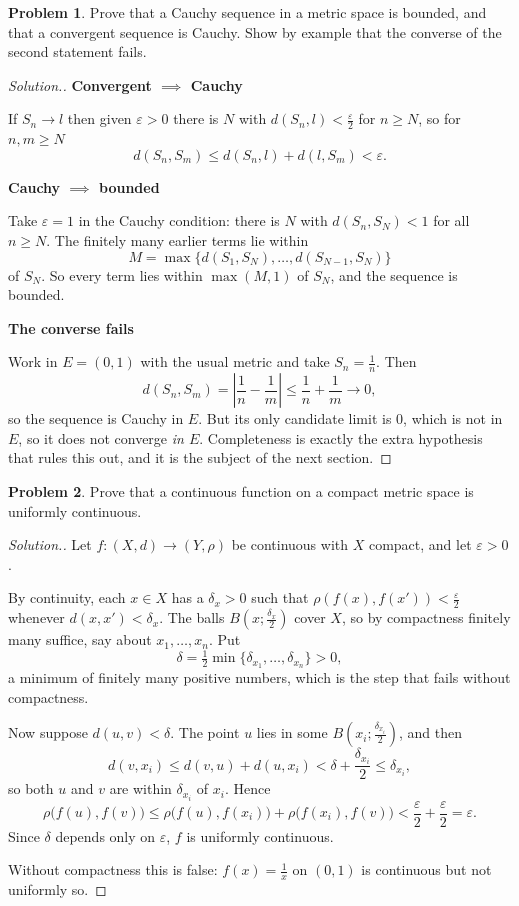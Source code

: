 \documentclass[11pt,a4paper]{article}
\theoremstyle{definition}
\newtheorem{problemx}{Problem}[section]
\newenvironment{problem}{\begin{problemx}}{\end{problemx}}
\newenvironment{solution}
  {\renewcommand{\qedsymbol}{}\begin{proof}[\textit{Solution}.]}
  {\end{proof}}
\newcommand{\subhead}[1]{%
  \par\medskip\noindent\textbf{#1}\par\nobreak\smallskip}
\begin{document}
\begin{problem}
Prove that a Cauchy sequence in a metric space is bounded, and that a
convergent sequence is Cauchy. Show by example that the converse of the second
statement fails.
\end{problem}
\begin{solution}
\subhead{Convergent $\implies$ Cauchy}
If $S_n\rightarrow l$ then given $\varepsilon>0$ there is $N$ with
$d(S_n,l)<\frac{\varepsilon}{2}$ for $n\geq N$, so for $n,m\geq N$
$$d(S_n,S_m)\leq d(S_n,l)+d(l,S_m)<\varepsilon .$$

\subhead{Cauchy $\implies$ bounded}
Take $\varepsilon=1$ in the Cauchy condition: there is $N$ with
$d(S_n,S_N)<1$ for all $n\geq N$. The finitely many earlier terms lie within
$$M=\max\{d(S_1,S_N),\dots,d(S_{N-1},S_N)\}$$
of $S_N$. So every term lies within $\max(M,1)$ of $S_N$, and the sequence is
bounded.

\subhead{The converse fails}
Work in $E=(0,1)$ with the usual metric and take $S_n=\frac1n$. Then
$$d(S_n,S_m)=\left|\frac1n-\frac1m\right|\leq\frac1n+\frac1m\rightarrow 0,$$
so the sequence is Cauchy in $E$. But its only candidate limit is $0$, which is
not in $E$, so it does not converge \emph{in $E$}. Completeness is exactly the
extra hypothesis that rules this out, and it is the subject of the next
section.
\end{solution}

\begin{problem}
Prove that a continuous function on a compact metric space is uniformly
continuous.
\end{problem}
\begin{solution}
Let $f:(X,d)\rightarrow(Y,\rho)$ be continuous with $X$ compact, and let
$\varepsilon>0$.

By continuity, each $x\in X$ has a $\delta_x>0$ such that
$\rho(f(x),f(x'))<\frac{\varepsilon}{2}$ whenever $d(x,x')<\delta_x$. The balls
$B\left(x;\frac{\delta_x}{2}\right)$ cover $X$, so by compactness finitely many
suffice, say about $x_1,\dots,x_n$. Put
$$\delta=\tfrac12\min\{\delta_{x_1},\dots,\delta_{x_n}\}>0 ,$$
a minimum of finitely many positive numbers, which is the step that fails
without compactness.

Now suppose $d(u,v)<\delta$. The point $u$ lies in some
$B\left(x_i;\frac{\delta_{x_i}}{2}\right)$, and then
$$d(v,x_i)\leq d(v,u)+d(u,x_i)<\delta+\frac{\delta_{x_i}}{2}\leq\delta_{x_i},$$
so both $u$ and $v$ are within $\delta_{x_i}$ of $x_i$. Hence
$$\rho\big(f(u),f(v)\big)\leq\rho\big(f(u),f(x_i)\big)+\rho\big(f(x_i),f(v)\big)
<\frac{\varepsilon}{2}+\frac{\varepsilon}{2}=\varepsilon .$$
Since $\delta$ depends only on $\varepsilon$, $f$ is uniformly continuous.

Without compactness this is false: $f(x)=\frac1x$ on $(0,1)$ is continuous but
not uniformly so.
\end{solution}
\end{document}
